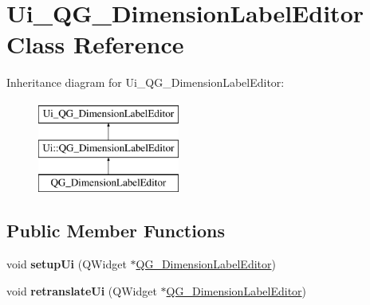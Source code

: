 \hypertarget{classUi__QG__DimensionLabelEditor}{\section{Ui\-\_\-\-Q\-G\-\_\-\-Dimension\-Label\-Editor Class Reference}
\label{classUi__QG__DimensionLabelEditor}
}
Inheritance diagram for Ui\-\_\-\-Q\-G\-\_\-\-Dimension\-Label\-Editor\-:\begin{figure}[H]
\begin{center}
\leavevmode
\includegraphics[height=3.000000cm]{classUi__QG__DimensionLabelEditor}
\end{center}
\end{figure}
\subsection*{Public Member Functions}
\begin{DoxyCompactItemize}
\item 
\hypertarget{classUi__QG__DimensionLabelEditor_a7f1814a969ab18273b5445d6cc238da1}{void {\bfseries setup\-Ui} (Q\-Widget $\ast$\hyperlink{classQG__DimensionLabelEditor}{Q\-G\-\_\-\-Dimension\-Label\-Editor})}\label{classUi__QG__DimensionLabelEditor_a7f1814a969ab18273b5445d6cc238da1}

\item 
\hypertarget{classUi__QG__DimensionLabelEditor_a65585826d23a96ca65c39d49fdabbcf4}{void {\bfseries retranslate\-Ui} (Q\-Widget $\ast$\hyperlink{classQG__DimensionLabelEditor}{Q\-G\-\_\-\-Dimension\-Label\-Editor})}\label{classUi__QG__DimensionLabelEditor_a65585826d23a96ca65c39d49fdabbcf4}

\end{DoxyCompactItemize}
